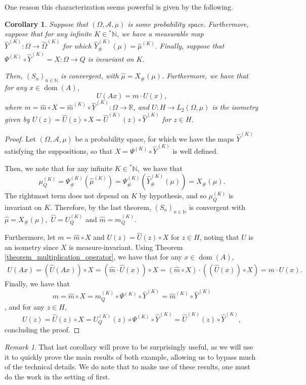 \documentclass{amsart}
\newtheorem{cor}[thm]{Corollary}
\theoremstyle{definition}
\theoremstyle{remark}
\newtheorem{remark}[thm]{Remark}
\def \Dom{\operatorname{dom}}
\def \HOM{\hat{\Omega}}
\def \HMU{\hat{\mu}}
\def \HU{\hat{U}}
\def \Hm{\hat{m}}
\begin{document}
One reason this characterization seems powerful is given by the following.
\begin{cor}\label{corollary_nonstandard_invariance}
	Suppose that $(\Omega, \mathcal{A}, \mu)$ is some probability space. Furthermore, suppose that for any infinite $K\in{}^*\mathbb{N}$, we have a measurable map $\hat{Y}^{(K)}:\Omega\rightarrow\HOM^{(K)}$ for which $\hat{Y}^{(K)}_{\#}(\mu)=\HMU^{(K)}.$ Finally, suppose that $\Psi^{(K)}\circ \hat{Y}^{(K)}=X:\Omega\rightarrow Q$ is invariant on $K$. 
	
	Then, $(S_n)_{n\in\mathbb{N}}$ is convergent, with $\HMU=X_{\#}(\mu)$. Furthermore, we have that for any $x\in\Dom(A),$  $$U(Ax)=m\cdot U(x),$$ where $m=\Hm\circ X=\Hm^{(K)}\circ \hat{Y}^{(K)}: \Omega\rightarrow\mathbb{R}$, and $U: H\rightarrow L_2(\Omega,\mu)$ is the isometry given by $U(z)=\HU(z)\circ X=\HU^{(K)}(z)\circ \hat{Y}^{(K)}$ for $z\in H$. %
\end{cor}
\begin{proof}
	Let $(\Omega,\mathcal{A},\mu)$ be a probability space, for which we have the maps $\hat{Y}^{(K)}$ satisfying the suppositions, so that $X=\Psi^{(K)}\circ \hat{Y}^{(K)}$ is well defined.
	
	Then, we note that for any infinite $K\in{}^*\mathbb{N},$ we have that $$\mu_Q^{(K)}=\Psi^{(K)}_{\#}(\HMU^{(K)})=\Psi^{(K)}_{\#}(\hat{Y}^{(K)}_{\#}(\mu))=X_{\#}(\mu).$$ The rightmost term does not depend on $K$ by hypothesis, and so $\mu_Q^{(K)}$ is invariant on $K$. Therefore, by the last theorem, $(S_n)_{n\in\mathbb{N}}$ is convergent with $\HMU=X_{\#}(\mu),$ $\HU=U_Q^{(K)}$ and $\Hm=m_Q^{(K)}.$
	
	Furthermore, let $m=\Hm\circ X$ and $U(z)=\HU(z)\circ X$  for $z\in H$, noting that $U$ is an isometry since $X$ is measure-invariant. Using Theorem \ref{theorem_multiplication_operator}, we have that for any $x\in\Dom(A),$
	\begin{align*}
		U(Ax)=(\HU(Ax))\circ X=(\Hm\cdot \HU(x))\circ X=(\Hm\circ X)\cdot ((\HU(x))\circ X)=m\cdot U(x).
	\end{align*} 
	Finally, we have that $$m=\Hm\circ X=m_Q^{(K)}\circ \Psi^{(K)}\circ \hat{Y}^{(K)}=\Hm^{(K)}\circ\hat{Y}^{(K)}$$, and for any $z\in H$, $$U(z)=\HU(z)\circ X=U_Q^{(K)}(z)\circ\Psi^{(K)}\circ \hat{Y}^{(K)}=\HU^{(K)}(z)\circ \hat{Y}^{(K)},$$ concluding the proof.
\end{proof}
\begin{remark}
	That last corollary will prove to be surprisingly useful, as we will use it to quickly prove the main results of both example, allowing us to bypass much of the technical details. We do note that to make use of these results, one must do the work in the setting of \cite{nonez2024spectralequivalencesnonstandardsamplings} first.
\end{remark}
\end{document}
